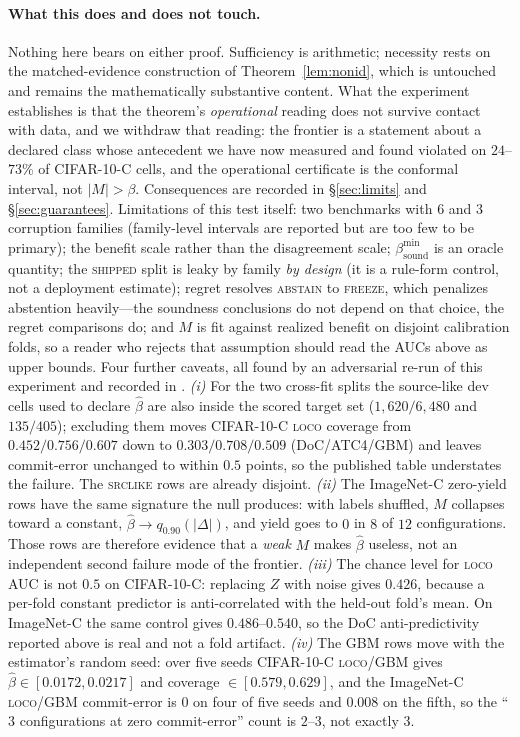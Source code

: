\paragraph{What this does and does not touch.} Nothing here bears on either proof. Sufficiency is
arithmetic; necessity rests on the matched-evidence construction of Theorem~\ref{lem:nonid}, which
is untouched and remains the mathematically substantive content. What the experiment establishes is
that the theorem's \emph{operational} reading does not survive contact with data, and we withdraw
that reading: the frontier is a statement about a declared class whose antecedent we have now
measured and found violated on $24$--$73\%$ of CIFAR-10-C cells, and the operational certificate is
the conformal interval, not $|M|>\beta$. Consequences are recorded in \S\ref{sec:limits} and
\S\ref{sec:guarantees}. Limitations of this test itself: two benchmarks with $6$ and
$3$ corruption families (family-level intervals are reported but are too few to be primary); the
benefit scale rather than the disagreement scale; $\beta^{\min}_{\mathrm{sound}}$ is an oracle
quantity; the \textsc{shipped} split is leaky by family \emph{by design} (it is a rule-form control,
not a deployment estimate); regret resolves \textsc{abstain} to \textsc{freeze}, which penalizes
abstention heavily---the soundness conclusions do not depend on that choice, the regret comparisons
do; and $M$ is fit against realized benefit on disjoint calibration folds, so a reader who rejects
that assumption should read the AUCs above as upper bounds.
Four further caveats, all found by an adversarial re-run of this experiment and recorded in
.
\emph{(i)} For the two cross-fit splits the source-like dev cells used to declare $\widehat\beta$
are also inside the scored target set ($1{,}620/6{,}480$ and $135/405$); excluding them moves
CIFAR-10-C \textsc{loco} coverage from $0.452/0.756/0.607$ down to $0.303/0.708/0.509$ (DoC/ATC4/GBM)
and leaves commit-error unchanged to within $0.5$ points, so the published table understates the
failure. The \textsc{srclike} rows are already disjoint.
\emph{(ii)} The ImageNet-C zero-yield rows have the same signature the null produces: with labels
shuffled, $M$ collapses toward a constant, $\widehat\beta\to q_{0.90}(|\Delta|)$, and yield goes to
$0$ in $8$ of $12$ configurations. Those rows are therefore evidence that a \emph{weak} $M$ makes
$\widehat\beta$ useless, not an independent second failure mode of the frontier.
\emph{(iii)} The chance level for \textsc{loco} AUC is not $0.5$ on CIFAR-10-C: replacing $Z$ with
noise gives $0.426$, because a per-fold constant predictor is anti-correlated with the held-out
fold's mean. On ImageNet-C the same control gives $0.486$--$0.540$, so the DoC anti-predictivity
reported above is real and not a fold artifact.
\emph{(iv)} The GBM rows move with the estimator's random seed: over five seeds CIFAR-10-C
\textsc{loco}/GBM gives $\widehat\beta\in[0.0172,0.0217]$ and coverage $\in[0.579,0.629]$, and the
ImageNet-C \textsc{loco}/GBM commit-error is $0$ on four of five seeds and $0.008$ on the fifth, so
the ``$3$ configurations at zero commit-error'' count is $2$--$3$, not exactly $3$.


